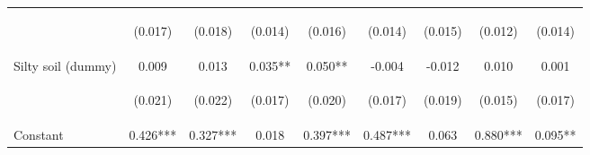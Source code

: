 \begin{center}
\begin{tabular}{lcccccccc}
\vspace{4pt} & \begin{footnotesize}(0.017)\end{footnotesize} & \begin{footnotesize}(0.018)\end{footnotesize} & \begin{footnotesize}(0.014)\end{footnotesize} & \begin{footnotesize}(0.016)\end{footnotesize} & \begin{footnotesize}(0.014)\end{footnotesize} & \begin{footnotesize}(0.015)\end{footnotesize} & \begin{footnotesize}(0.012)\end{footnotesize} & \begin{footnotesize}(0.014)\end{footnotesize} \\
Silty soil (dummy) & 0.009 & 0.013 & 0.035** & 0.050** & -0.004 & -0.012 & 0.010 & 0.001 \\
\vspace{4pt} & \begin{footnotesize}(0.021)\end{footnotesize} & \begin{footnotesize}(0.022)\end{footnotesize} & \begin{footnotesize}(0.017)\end{footnotesize} & \begin{footnotesize}(0.020)\end{footnotesize} & \begin{footnotesize}(0.017)\end{footnotesize} & \begin{footnotesize}(0.019)\end{footnotesize} & \begin{footnotesize}(0.015)\end{footnotesize} & \begin{footnotesize}(0.017)\end{footnotesize} \\
Constant & 0.426*** & 0.327*** & 0.018 & 0.397*** & 0.487*** & 0.063 & 0.880*** & 0.095** \\

\end{tabular}
\end{center}

